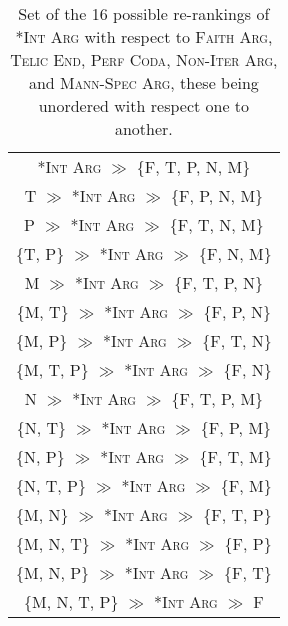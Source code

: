 \begin{table}[htb] %
\caption{Set of the 16 possible re-rankings of \textsc{*Int Arg} with respect to \textsc{Faith Arg}, \textsc{Telic End}, \textsc{Perf Coda}, \textsc{Non-Iter Arg}, and \textsc{Mann-Spec Arg}, these being unordered with respect one to another.}
\begin{tabular}{c}
\textsc{*Int Arg} $\gg$ \{F, T, P, N, M\} \\
T $\gg$ \textsc{*Int Arg} $\gg$ \{F, P, N, M\} \\
P $\gg$ \textsc{*Int Arg} $\gg$ \{F, T, N, M\} \\
\{T, P\} $\gg$ \textsc{*Int Arg} $\gg$ \{F, N, M\} \\
M $\gg$ \textsc{*Int Arg} $\gg$ \{F, T, P, N\} \\
\{M, T\} $\gg$ \textsc{*Int Arg} $\gg$ \{F, P, N\} \\
\{M, P\} $\gg$ \textsc{*Int Arg} $\gg$ \{F, T, N\} \\
\{M, T, P\} $\gg$ \textsc{*Int Arg} $\gg$ \{F, N\} \\
N $\gg$ \textsc{*Int Arg} $\gg$ \{F, T, P, M\} \\
\{N, T\} $\gg$ \textsc{*Int Arg} $\gg$ \{F, P, M\} \\
\{N, P\} $\gg$ \textsc{*Int Arg} $\gg$ \{F, T, M\} \\
\{N, T, P\} $\gg$ \textsc{*Int Arg} $\gg$ \{F, M\} \\
\{M, N\} $\gg$ \textsc{*Int Arg} $\gg$ \{F, T, P\} \\
\{M, N, T\} $\gg$ \textsc{*Int Arg} $\gg$ \{F, P\} \\
\{M, N, P\} $\gg$ \textsc{*Int Arg} $\gg$ \{F, T\} \\
\{M, N, T, P\} $\gg$ \textsc{*Int Arg} $\gg$ F \\
\end{tabular}
\end{table}

